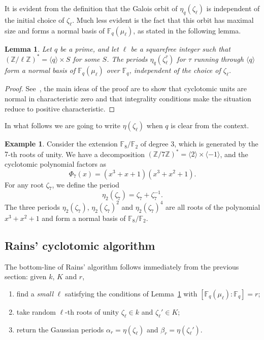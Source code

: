 \documentclass[12pt]{article}
\theoremstyle{plain}
\newtheorem{lemma}[theorem]{Lemma}
\theoremstyle{definition}
\newtheorem{example}[theorem]{Example}
\def\Z{\ensuremath{\mathbb{Z}}}
\def\F{\ensuremath{\mathbb{F}}}
\newcounter{algorithm}
\begin{document}
It is evident from the definition that the Galois orbit of
$\eta_q(\zeta_\ell)$ is independent of the initial choice of
$\zeta_\ell$. Much less evident is the fact that this orbit has
maximal size and forms a normal basis of $\F_q(\mu_\ell)$, as stated
in the following lemma.

\begin{lemma}
  \label{th:gaussian}
  Let $q$ be a prime, and let $\ell$ be a squarefree integer such that
  $(\Z/\ell\Z)^\ast = \langle q\rangle \times S$ for some $S$.  The
  periods $\eta_q(\zeta_\ell^\tau)$ for $\tau$ running through
  $\langle q\rangle$ form a normal basis of $\F_q(\mu_\ell)$ over
  $\F_q$, independent of the choice of $\zeta_\ell$.
\end{lemma}
\begin{proof}
  See~\cite[Main Theorem]{feisel1999normal},
  the main ideas of the proof are to show that cyclotomic units
  are normal in characteristic zero and that integrality conditions
  make the situation reduce to positive characteristic.
\end{proof}

In what follows we are going to write $\eta(\zeta_\ell)$ when $q$ is
clear from the context.

\begin{example} 
  Consider the extension $\F_8/\F_2$ of degree $3$, which is generated
  by the $7$-th roots of unity. We have a decomposition
  $(\Z/7\Z)^\ast=\langle 2\rangle\times\langle-1\rangle$, and the
  cyclotomic polynomial factors as
  \begin{equation}
    \Phi_7(x) = (x^3 + x + 1) (x^3 + x^2 + 1).
  \end{equation}
  For any root $\zeta_7$, we define the period
  \begin{equation}
    \eta_2(\zeta_7) = \zeta_7+\zeta_7^{-1}.
  \end{equation}
  The three periods $\eta_2(\zeta_7)$, $\eta_2(\zeta_7)^2$ and
  $\eta_2(\zeta_7)^4$ are all roots of the polynomial $x^3+x^2+1$ and
  form a normal basis of $\F_8/\F_2$.
\end{example}

\subsection{Rains' cyclotomic algorithm}

The bottom-line of Rains' algorithm follows immediately from the
previous section: given $k$, $K$ and $r$,
\begin{enumerate}
\item find a \emph{small} $\ell$ satisfying the conditions of
  Lemma~\ref{th:gaussian} with $[\F_q(\mu_\ell):\F_q]=r$;
\item take random $\ell$-th roots of unity $\zeta_\ell\in k$ and
  $\zeta_\ell'\in K$;
\item return the Gaussian periods $\alpha_r=\eta(\zeta_\ell)$ and
  $\beta_r=\eta(\zeta_\ell')$.
\end{enumerate}
\end{document}
